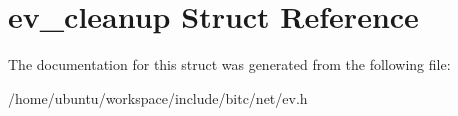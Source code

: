 \hypertarget{structev__cleanup}{\section{ev\-\_\-cleanup Struct Reference}
\label{structev__cleanup}
}


The documentation for this struct was generated from the following file\-:\begin{DoxyCompactItemize}
\item 
/home/ubuntu/workspace/include/bitc/net/ev.\-h\end{DoxyCompactItemize}
